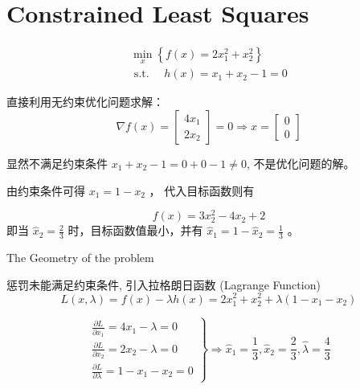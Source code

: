 \chapter{Constrained Least Squares}

\begin{problem}
    $$
\begin{array}{l}
\min _{x}\left\{f(x)=2 x_{1}^{2}+x_{2}^{2}\right\} \\
\text { s.t. } \quad h(x)=x_{1}+x_{2}-1=0
\end{array}
$$

直接利用无约束优化问题求解： 
$$ \nabla f(x)=\left[\begin{array}{l}4 x_{1} \\ 2 x_{2}\end{array}\right]=0 \Rightarrow x=\left[\begin{array}{l}0 \\ 0\end{array}\right] $$

显然不满足约束条件 $ x_{1}+x_{2}-1=0+0-1 \neq 0 $, 不是优化问题的解。
\end{problem}

由约束条件可得 $ x_{1}=1-x_{2} $ ， 代入目标函数则有

$$ f(x)=3 x_{2}^{2}-4 x_{2}+2 $$
即当 $ \hat{x}_{2}=\frac{2}{3} $ 时，目标函数值最小，并有 $ \hat{x}_{1}=1-\hat{x}_{2}=\frac{1}{3} $ 。

\begin{FigureCenter}{The Geometry of the problem}
    
\end{FigureCenter}

惩罚未能满足约束条件, 引入拉格朗日函数 (Lagrange Function)
$$
L(x, \lambda)=f(x)-\lambda h(x)=2 x_{1}^{2}+x_{2}^{2}+\lambda\left(1-x_{1}-x_{2}\right)
$$

$$ \left.\begin{array}{l}\frac{\partial L}{\partial x_{1}}=4 x_{1}-\lambda=0 \\ \frac{\partial L}{\partial x_{2}}=2 x_{2}-\lambda=0 \\ \frac{\partial L}{\partial \lambda}=1-x_{1}-x_{2}=0\end{array}\right\} \Rightarrow \hat{x}_{1}=\frac{1}{3}, \hat{x}_{2}=\frac{2}{3}, \hat{\lambda}=\frac{4}{3} $$

